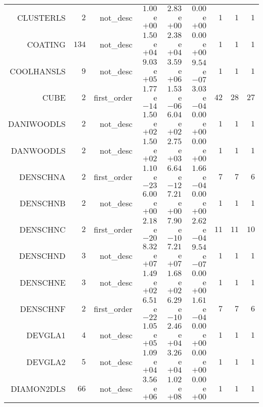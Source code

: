 \begin{longtable}{rrrrrrrrr}
CLUSTERLS & \(     2\) & not\_desc & \( 1.00\)e\(+00\) & \( 2.83\)e\(+00\) & \( 0.00\)e\(+00\) & \(     1\) & \(     1\) & \(     1\) \\
COATING & \(   134\) & not\_desc & \( 1.50\)e\(+04\) & \( 2.38\)e\(+04\) & \( 0.00\)e\(+00\) & \(     1\) & \(     1\) & \(     1\) \\
COOLHANSLS & \(     9\) & not\_desc & \( 9.03\)e\(+05\) & \( 3.59\)e\(+06\) & \( 9.54\)e\(-07\) & \(     1\) & \(     1\) & \(     1\) \\
CUBE & \(     2\) & first\_order & \( 1.77\)e\(-14\) & \( 1.53\)e\(-06\) & \( 3.03\)e\(-04\) & \(    42\) & \(    28\) & \(    27\) \\
DANIWOODLS & \(     2\) & not\_desc & \( 1.50\)e\(+02\) & \( 6.04\)e\(+02\) & \( 0.00\)e\(+00\) & \(     1\) & \(     1\) & \(     1\) \\
DANWOODLS & \(     2\) & not\_desc & \( 1.50\)e\(+02\) & \( 2.75\)e\(+03\) & \( 0.00\)e\(+00\) & \(     1\) & \(     1\) & \(     1\) \\
DENSCHNA & \(     2\) & first\_order & \( 1.10\)e\(-23\) & \( 6.64\)e\(-12\) & \( 1.66\)e\(-04\) & \(     7\) & \(     7\) & \(     6\) \\
DENSCHNB & \(     2\) & not\_desc & \( 6.00\)e\(+00\) & \( 7.21\)e\(+00\) & \( 0.00\)e\(+00\) & \(     1\) & \(     1\) & \(     1\) \\
DENSCHNC & \(     2\) & first\_order & \( 2.18\)e\(-20\) & \( 7.90\)e\(-10\) & \( 2.62\)e\(-04\) & \(    11\) & \(    11\) & \(    10\) \\
DENSCHND & \(     3\) & not\_desc & \( 8.32\)e\(+07\) & \( 7.21\)e\(+07\) & \( 9.54\)e\(-07\) & \(     1\) & \(     1\) & \(     1\) \\
DENSCHNE & \(     3\) & not\_desc & \( 1.49\)e\(+02\) & \( 1.68\)e\(+02\) & \( 0.00\)e\(+00\) & \(     1\) & \(     1\) & \(     1\) \\
DENSCHNF & \(     2\) & first\_order & \( 6.51\)e\(-22\) & \( 6.29\)e\(-10\) & \( 1.61\)e\(-04\) & \(     7\) & \(     7\) & \(     6\) \\
DEVGLA1 & \(     4\) & not\_desc & \( 1.05\)e\(+05\) & \( 2.46\)e\(+04\) & \( 0.00\)e\(+00\) & \(     1\) & \(     1\) & \(     1\) \\
DEVGLA2 & \(     5\) & not\_desc & \( 1.09\)e\(+04\) & \( 3.26\)e\(+04\) & \( 0.00\)e\(+00\) & \(     1\) & \(     1\) & \(     1\) \\
DIAMON2DLS & \(    66\) & not\_desc & \( 3.56\)e\(+06\) & \( 1.02\)e\(+08\) & \( 0.00\)e\(+00\) & \(     1\) & \(     1\) & \(     1\) \\

\end{longtable}
